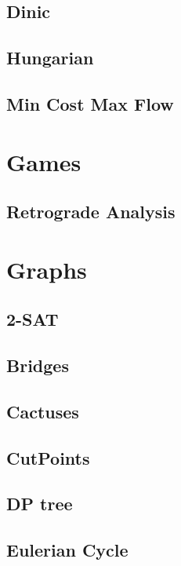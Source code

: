 \subsection{Dinic}

\subsection{Hungarian}

\subsection{Min Cost Max Flow}



\section{Games}

\subsection{Retrograde Analysis}



\section{Graphs}

\subsection{2-SAT}

\subsection{Bridges}

\subsection{Cactuses}

\subsection{CutPoints}

\subsection{DP tree}

\subsection{Eulerian Cycle}

